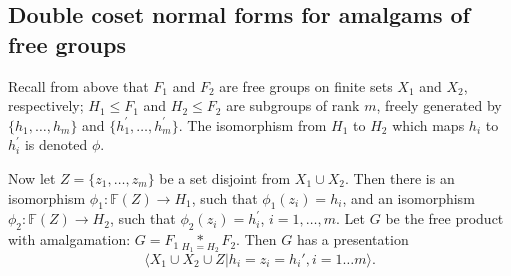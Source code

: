 \documentclass[a4paper,12pt]{article}
\numberwithin{equation}{section}
\numberwithin{figure}{section}
\newcommand{\FF}{\ensuremath{\mathbb{F}}}
\newcommand{\la}{\langle}
\newcommand{\ra}{\rangle}
\newcommand{\maps}{\rightarrow}
\begin{document}
\subsection{Double coset normal forms for amalgams of free groups}\label{sec:dcnf}

Recall from above that $F_1$ and $F_2$ are free groups on finite sets
$X_1$ and $X_2$, respectively;
 $H_1 \leq F_1$ and $H_2 \leq F_2$ are subgroups of rank $m$, freely
generated by $\{h_1,\ldots, h_m\}$ and $\{h_1^\prime,\ldots ,h_m^\prime\}$. 
The isomorphism from $H_1$ to $H_2$ which maps $h_i$ to $h_i^\prime$ is
denoted $\phi$.

Now let
$Z=\{z_1,\ldots, z_m\}$ be a set disjoint from $X_1\cup X_2$. Then there
is an isomorphism $\phi_1:\FF(Z)\maps H_1$, such that $\phi_1(z_i)=h_i$,
 and an isomorphism $\phi_2:\FF(Z)\maps H_2$, such that $\phi_2(z_i)
=h_i^\prime$, $i=1,\ldots, m$.
 Let $G$ be the free product with amalgamation:
${G = F_1 \underset{H_1=H_2}{\ast} F_2}$.  Then $G$ has a
 presentation
\[\la X_1\cup X_2\cup Z  | h_i =z_i= h_i', i=1 \ldots m\ra.\]
\end{document}
